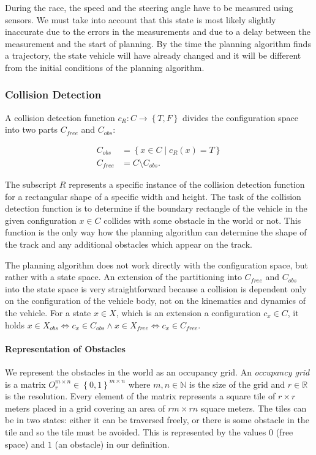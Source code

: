 During the race, the speed and the steering angle have to be measured using sensors. We must take into account that this state is most likely slightly inaccurate due to the errors in the measurements and due to a delay between the measurement and the start of planning. By the time the planning algorithm finds a trajectory, the state vehicle will have already changed and it will be different from the initial conditions of the planning algorithm.

\subsubsection{Collision Detection}

A collision detection function $c_{R}: C \rightarrow \left\{T, F\right\}$ divides the configuration space into two parts $C_{free}$ and $C_{obs}$:

\begin{equation*}
\begin{aligned}
	C_{obs} &= \left\{x\in C \mid c_{R}(x)=T\right\} \\
	C_{free} &= C \setminus C_{obs}.
\end{aligned}
\end{equation*}

The subscript $R$ represents a specific instance of the collision detection function for a rectangular shape of a specific width and height. The task of the collision detection function is to determine if the boundary rectangle of the vehicle in the given configuration $x\in C$ collides with some obstacle in the world or not. This function is the only way how the planning algorithm can determine the shape of the track and any additional obstacles which appear on the track.

The planning algorithm does not work directly with the configuration space, but rather with a state space. An extension of the partitioning into $C_{free}$ and $C_{obs}$ into the state space is very straightforward because a collision is dependent only on the configuration of the vehicle body, not on the kinematics and dynamics of the vehicle. For a state $x\in X$, which is an extension a configuration $c_x \in C$, it holds $x\in X_{obs} \iff c_x\in C_{obs} \wedge x\in X_{free} \iff c_x\in C_{free}$.

\paragraph{Representation of Obstacles}
We represent the obstacles in the world as an occupancy grid. An \textit{occupancy grid} is a matrix $O_r^{m\times n}\in \left\{0, 1\right\}^{m\times n}$ where $m,n\in\mathbb{N}$ is the size of the grid and $r\in\mathbb{R}$ is the resolution. Every element of the matrix represents a square tile of $r\times r$ meters placed in a grid covering an area of $rm\times rn$ square meters. The tiles can be in two states: either it can be traversed freely, or there is some obstacle in the tile and so the tile must be avoided. This is represented by the values $0$ (free space) and $1$ (an obstacle) in our definition.

